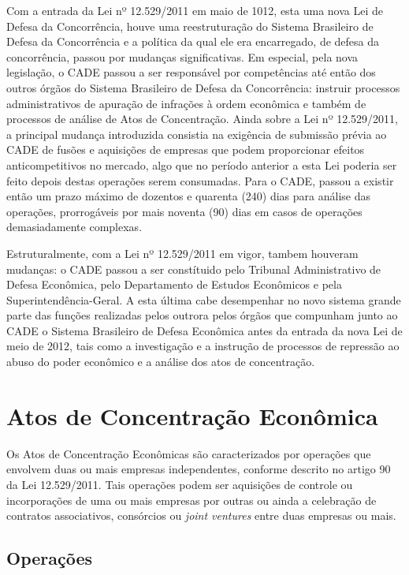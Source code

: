 \documentclass[11pt]{report}
\begin{document}
Com a entrada da Lei nº 12.529/2011 em maio de 1012, esta uma nova Lei de Defesa da Concorrência, houve uma reestruturação do Sistema Brasileiro de Defesa da Concorrência e a política
da qual ele era encarregado, de defesa da concorrência, passou por mudanças significativas. Em especial, pela nova legislação, o CADE passou a ser responsável por competências até
então dos outros órgãos do Sistema Brasileiro de Defesa da Concorrência: instruir processos administrativos de apuração de infrações à ordem econômica e também de processos de análise
de Atos de Concentração. Ainda sobre a Lei nº 12.529/2011, a principal mudança introduzida consistia na exigência de submissão
prévia ao CADE de fusões e aquisições de empresas que podem proporcionar efeitos anticompetitivos no mercado, algo que no período anterior a esta Lei poderia ser feito depois destas
operações serem consumadas. Para o CADE, passou a existir então um prazo máximo de dozentos e quarenta (240) dias para análise das operações, prorrogáveis por mais noventa (90) dias
em casos de operações demasiadamente complexas.

Estruturalmente, com a Lei nº 12.529/2011 em vigor, tambem houveram mudanças: o CADE passou a ser constítuido pelo Tribunal Administrativo de Defesa Econômica, pelo Departamento de
Estudos Econômicos e pela Superintendência-Geral. A esta última cabe desempenhar no novo sistema grande parte das funções realizadas pelos outrora pelos órgãos que compunham junto
ao CADE o Sistema Brasileiro de Defesa Econômica antes da entrada da nova Lei de meio de 2012, tais como a investigação e a instrução de processos de repressão ao abuso do poder
econômico e a análise dos atos de concentração.

\section{Atos de Concentração Econômica}

\indent\indent Os Atos de Concentração Econômicas são caracterizados por operações que envolvem duas ou mais empresas independentes, conforme descrito no artigo 90 da Lei 12.529/2011. Tais operações
podem ser aquisições de controle ou incorporações de uma ou mais empresas por outras ou ainda a celebração de contratos associativos, consórcios ou \textit{joint ventures} entre duas
empresas ou mais.

\subsection{Operações}
\end{document}
